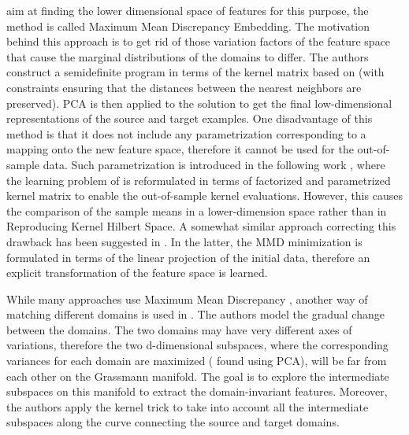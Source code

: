 \citep{pan2008transfer} aim at finding the lower dimensional space of features for this purpose, the method is called Maximum Mean Discrepancy Embedding. The motivation behind this approach is to get rid of those variation factors of the feature space that cause the marginal distributions of the domains to differ. The authors construct a semidefinite program in terms of the kernel matrix based on  (with constraints ensuring that the distances between the nearest neighbors are preserved). PCA is then applied to the solution to get the final low-dimensional representations of the source and target examples. One disadvantage of this method is that it does not include any parametrization corresponding to a mapping onto the new feature space, therefore it cannot be used for the out-of-sample data. Such parametrization is introduced in the following work \citep{pan2011domain}, where the learning problem of \citep{huang2007correcting} is reformulated in terms of factorized and parametrized kernel matrix to enable the out-of-sample kernel evaluations. However, this causes the comparison of the sample means in a lower-dimension space rather than in Reproducing Kernel Hilbert Space. A somewhat similar approach correcting this drawback has been suggested in \citep{baktashmotlagh2013unsupervised}. In the latter, the MMD minimization is formulated in terms of the linear projection of the initial data, therefore an explicit transformation of the feature space is learned.

While many approaches use Maximum Mean Discrepancy , another way of matching different domains is used in \citep{gong2012geodesic}. The authors model the gradual change between the domains. The two domains may have very different axes of variations, therefore the two d-dimensional subspaces, where the corresponding variances for each domain are maximized (\ie{} found using PCA), will be far from each other on the Grassmann manifold. The goal is to explore the intermediate subspaces on this manifold to extract the domain-invariant features. Moreover, the authors apply the kernel trick to take into account all the intermediate subspaces along the curve connecting the source and target domains. %

